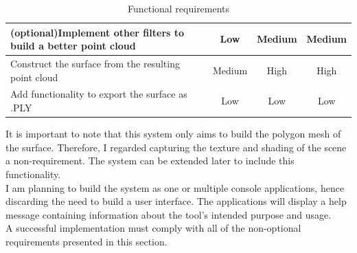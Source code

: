\documentclass[12pt,a4paper,twoside,openright]{report}
\begin{document}
\begin{samepage}
\begin{center}
\begin{table}
\begin{tabularx}{\textwidth}{@{} Y c c c @{}}
(optional)Implement other filters to build a better point cloud         &   Low       &     Medium      &   Medium \\ \hline \addlinespace
Construct the surface from the resulting point cloud                    &   Medium       &     High      &   High \\ \hline \addlinespace
Add functionality to export the surface as .PLY                         &   Low       &     Low      &   Low \\ 
\bottomrule
\end{tabularx}
\caption{Functional requirements} 
\label{table:nonlin}
\end{table}
\end{center}
\end{samepage}
It is important to note that this system only aims to build the polygon mesh of the surface. Therefore, I regarded capturing the texture and shading of the scene a non-requirement. The system can be extended later to include this functionality.\\
I am planning to build the system as one or multiple console applications, hence discarding the need to build a user interface. The applications will display a help message containing information about the tool's intended purpose and usage.\\
A successful implementation must comply with all of the non-optional requirements presented in this section.
\end{document}
